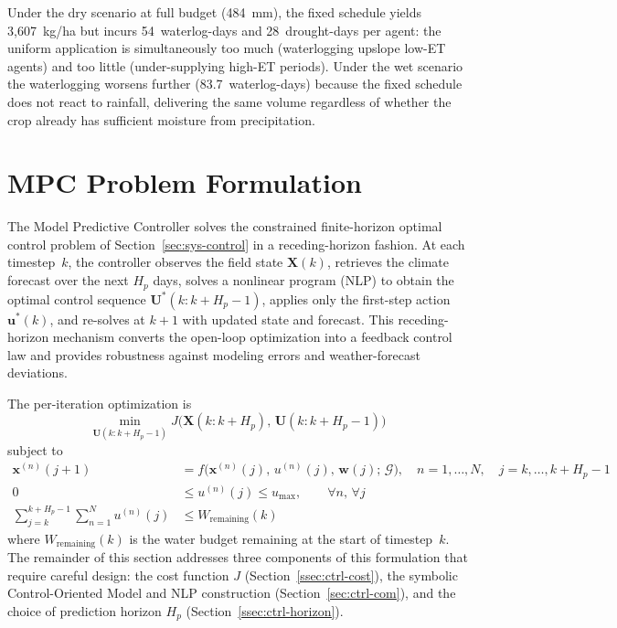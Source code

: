 Under the dry scenario at full budget (484~mm), the fixed schedule yields
3{,}607~kg/ha but incurs 54~waterlog-days and 28~drought-days per agent: the
uniform application is simultaneously too much (waterlogging upslope low-ET
agents) and too little (under-supplying high-ET periods). Under the wet
scenario the waterlogging worsens further (83.7~waterlog-days) because the
fixed schedule does not react to rainfall, delivering the same volume
regardless of whether the crop already has sufficient moisture from
precipitation.

\section{MPC Problem Formulation}
\label{sec:ctrl-mpc-formulation}

The Model Predictive Controller solves the constrained finite-horizon optimal
control problem of Section~\ref{sec:sys-control} in a receding-horizon
fashion. At each timestep~$k$, the controller observes the field state
$\mathbf{X}(k)$, retrieves the climate forecast over the next $H_p$ days,
solves a nonlinear program (NLP) to obtain the optimal control sequence
$\mathbf{U}^*(k:k+H_p-1)$, applies only the first-step action
$\mathbf{u}^*(k)$, and re-solves at $k+1$ with updated state and forecast.
This receding-horizon mechanism converts the open-loop optimization into a
feedback control law and provides robustness against modeling errors and
weather-forecast deviations.

The per-iteration optimization is
\begin{equation}
\min_{\mathbf{U}(k:k+H_p-1)}
J\bigl(\mathbf{X}(k:k+H_p),\,\mathbf{U}(k:k+H_p-1)\bigr)
\label{eq:mpc-ocp}
\end{equation}
subject to
\begin{align}
\mathbf{x}^{(n)}(j+1) &= f\!\bigl(\mathbf{x}^{(n)}(j),\,u^{(n)}(j),\,
  \mathbf{w}(j);\,\mathcal{G}\bigr),
  \quad n=1,\ldots,N,\quad j=k,\ldots,k+H_p-1
  \label{eq:mpc-dyn}\\
0 &\leq u^{(n)}(j) \leq u_{\max}, \qquad \forall n,\,\forall j
  \label{eq:mpc-bounds}\\
\sum_{j=k}^{k+H_p-1}\sum_{n=1}^{N} u^{(n)}(j) &\leq W_{\mathrm{remaining}}(k)
  \label{eq:mpc-budget}
\end{align}
where $W_{\mathrm{remaining}}(k)$ is the water budget remaining at the start
of timestep~$k$. The remainder of this section addresses three components of
this formulation that require careful design: the cost function $J$
(Section~\ref{ssec:ctrl-cost}), the symbolic Control-Oriented Model and
NLP construction (Section~\ref{sec:ctrl-com}), and the choice of prediction
horizon $H_p$ (Section~\ref{ssec:ctrl-horizon}).

